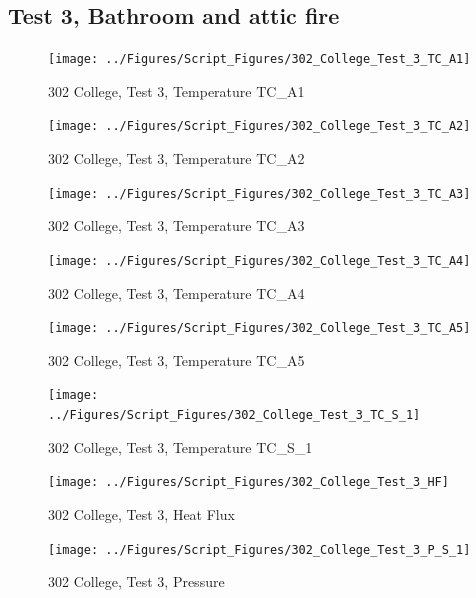 \documentclass[12pt,oneside]{book}
\begin{document}
\clearpage


\subsection{Test 3, Bathroom and attic fire}

\begin{figure}[!ht]
\texttt{[image: ../Figures/Script\_Figures/302\_College\_Test\_3\_TC\_A1]}
\caption{302 College, Test 3, Temperature TC\_A1}
\label{fig:302_College_Test_3_TC_A1}
\end{figure}

\begin{figure}[!ht]
\texttt{[image: ../Figures/Script\_Figures/302\_College\_Test\_3\_TC\_A2]}
\caption{302 College, Test 3, Temperature TC\_A2}
\label{fig:302_College_Test_3_TC_A2}
\end{figure}

\begin{figure}[!ht]
\texttt{[image: ../Figures/Script\_Figures/302\_College\_Test\_3\_TC\_A3]}
\caption{302 College, Test 3, Temperature TC\_A3}
\label{fig:302_College_Test_3_TC_A3}
\end{figure}

\begin{figure}[!ht]
\texttt{[image: ../Figures/Script\_Figures/302\_College\_Test\_3\_TC\_A4]}
\caption{302 College, Test 3, Temperature TC\_A4}
\label{fig:302_College_Test_3_TC_A4}
\end{figure}

\begin{figure}[!ht]
\texttt{[image: ../Figures/Script\_Figures/302\_College\_Test\_3\_TC\_A5]}
\caption{302 College, Test 3, Temperature TC\_A5}
\label{fig:302_College_Test_3_TC_A5}
\end{figure}

\begin{figure}[!ht]
\texttt{[image: ../Figures/Script\_Figures/302\_College\_Test\_3\_TC\_S\_1]}
\caption{302 College, Test 3, Temperature TC\_S\_1}
\label{fig:302_College_Test_3_TC_S_1}
\end{figure}

\begin{figure}[!ht]
\texttt{[image: ../Figures/Script\_Figures/302\_College\_Test\_3\_HF]}
\caption{302 College, Test 3, Heat Flux}
\label{fig:302_College_Test_3_HF}
\end{figure}

\begin{figure}[!ht]
\texttt{[image: ../Figures/Script\_Figures/302\_College\_Test\_3\_P\_S\_1]}
\caption{302 College, Test 3, Pressure}
\label{fig:302_College_Test_3_P_S_1}
\end{figure}
\end{document}
